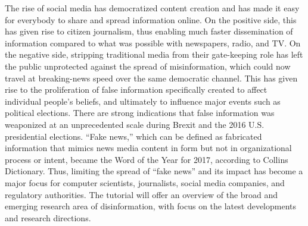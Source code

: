 The rise of social media has democratized content creation and has made it easy for everybody to share and spread information online. On the positive side, this has given rise to citizen journalism, thus enabling much faster dissemination of information compared to what was possible with newspapers, radio, and TV. On the negative side, stripping traditional media from their gate-keeping role has left the public unprotected against the spread of misinformation, which could now travel at breaking-news speed over the same democratic channel. This has given rise to the proliferation of false information specifically created to affect individual people's beliefs, and ultimately to influence major events such as political elections. There are strong indications that false information was weaponized at an unprecedented scale during Brexit and the 2016 U.S. presidential elections. ``Fake news,'' which can be defined as fabricated information that mimics news media content in form but not in organizational process or intent, became the Word of the Year for 2017, according to Collins Dictionary. Thus, limiting the spread of ``fake news'' and its impact has become a major focus for computer scientists, journalists, social media companies, and regulatory authorities. The tutorial will offer an overview of the broad and emerging research area of disinformation, with focus on the latest developments and research directions.
